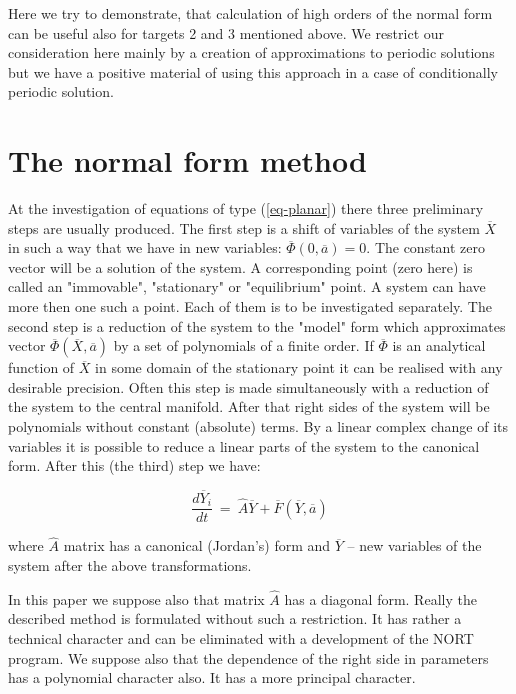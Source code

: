    Here we try to demonstrate, that calculation of high orders of
the normal form can be useful also for targets 2 and 3 mentioned above.
We restrict our consideration here mainly by a creation of approximations 
to periodic solutions but we have a positive material of using
this approach in a case of conditionally periodic solution.

\section{The normal form method}

   At the investigation of equations of type (\ref{eq-planar}) there
three preliminary steps are usually produced. The first step is a shift 
of variables of the system $\overline{X}$ in such a way that we 
have in new variables: $\overline{\Phi}(0,\overline{a}) = 0$. 
The constant zero vector will be a solution of the 
system. A corresponding point (zero here) is called an "immovable", 
"stationary" or "equilibrium" point. A system can have more then one 
such a point. Each of them is to be investigated separately.
The second step is a reduction of the system to the "model" 
form which approximates vector $\overline{\Phi}(\overline{X},
\overline{a})$ by a set of polynomials of a finite order. If 
$\overline{\Phi}$ is an analytical function of $\overline{X}$
in some domain of the stationary point it can be realised with any
desirable precision. Often this step is made simultaneously with a
reduction of the system to the central manifold. After that
right sides of the system will be polynomials without 
constant (absolute) terms. By a linear complex change of its variables it is 
possible to reduce a linear parts of the system to the canonical
form. After this (the third) step we have: 

\begin{equation}
\label{eq-prep}
\frac{d\overline{Y}_i}{dt}\ =\ \hat{A} \overline{Y}+
      \overline{F}(\overline{Y},
\overline{a})
\end{equation}

\noindent
where $\hat{A}$ matrix has a canonical (Jordan's) form and 
$\overline{Y}$ -- new variables of the system after the above 
transformations.

   In this paper we suppose also that matrix $\hat{A}$ has a 
diagonal form. Really the described method is formulated without 
such a restriction. It has rather a technical character and can be 
eliminated with a development of the NORT program. We suppose also
that the dependence of the right side in parameters has a polynomial
character also. It has a more principal character. 

